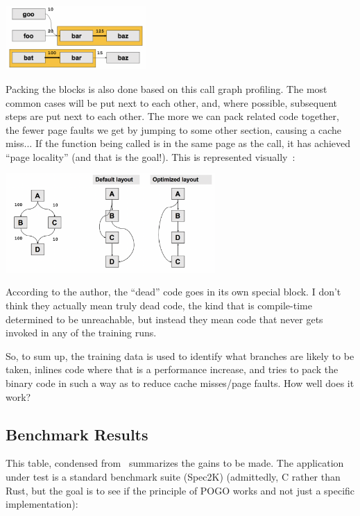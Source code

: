 \documentclass[a4paper]{report}
\begin{document}
\begin{center}
	\includegraphics[width=0.4\textwidth]{images/callpaths4.png}
\end{center}

Packing the blocks is also done based on this call graph profiling. The most common cases will be put next to each other, and, where possible, subsequent steps are put next to each other. The more we can pack related code together, the fewer page faults we get by jumping to some other section, causing a cache miss... If the function being called is in the same page as the call, it has achieved ``page locality'' (and that is the goal!). This is represented visually~\cite{pogo2}:

\begin{center}
	\includegraphics[width=0.6\textwidth]{images/blocklayout.png}
\end{center}

According to the author, the ``dead'' code goes in its own special block. I don't think they actually mean truly dead code, the kind that is compile-time determined to be unreachable, but instead they mean code that never gets invoked in any of the training runs.

So, to sum up, the training data is used to identify what branches are likely to be taken, inlines code where that is a performance increase, and tries to pack the binary code in such a way as to reduce cache misses/page faults. How well does it work?

\subsection*{Benchmark Results}

This table, condensed from~\cite{pogo2} summarizes the gains to be made. The application under test is a standard benchmark suite (Spec2K) (admittedly, C rather than Rust, but the goal is to see if the principle of POGO works and not just a specific implementation):
\end{document}
